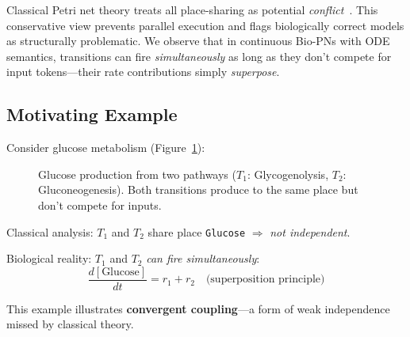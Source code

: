 \documentclass[runningheads]{llncs}
\begin{document}
Classical Petri net theory treats all place-sharing as potential \emph{conflict}~\cite{Reisig2013}. This conservative view prevents parallel execution and flags biologically correct models as structurally problematic. We observe that in continuous Bio-PNs with ODE semantics, transitions can fire \emph{simultaneously} as long as they don't compete for input tokens---their rate contributions simply \emph{superpose}.

\subsection{Motivating Example}

Consider glucose metabolism (Figure~\ref{fig:glucose_example}):

\begin{figure}[t]
\centering
{}
\caption{Glucose production from two pathways ($T_1$: Glycogenolysis, $T_2$: Gluconeogenesis). Both transitions produce to the same place but don't compete for inputs.}
\label{fig:glucose_example}
\end{figure}

Classical analysis: $T_1$ and $T_2$ share place \texttt{Glucose} $\Rightarrow$ \emph{not independent}.

Biological reality: $T_1$ and $T_2$ \emph{can fire simultaneously}:
\begin{equation}
\frac{d[\text{Glucose}]}{dt} = r_1 + r_2 \quad \text{(superposition principle)}
\end{equation}

This example illustrates \textbf{convergent coupling}---a form of weak independence missed by classical theory.
\end{document}
